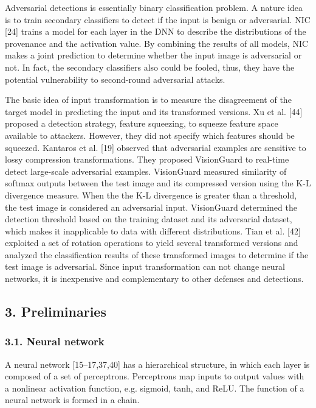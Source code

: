 \documentclass{article}
\begin{document}
Adversarial detections is essentially binary classification problem. A nature idea is to train secondary classifiers to detect if the input is benign or adversarial. NIC [24] trains a model for each layer in the DNN to describe the distributions of the provenance and the activation value. By combining the results of all models, NIC makes a joint prediction to determine whether the input image is adversarial or not. In fact, the secondary classifiers also could be fooled, thus, they have the potential vulnerability to second-round adversarial attacks.

The basic idea of input transformation is to measure the disagreement of the target model in predicting the input and its transformed versions. Xu et al. [44] proposed a detection strategy, feature squeezing, to squeeze feature space available to attackers. However, they did not specify which features should be squeezed. Kantaros et al. [19] observed that adversarial examples are sensitive to lossy compression transformations. They proposed VisionGuard to real-time detect large-scale adversarial examples. VisionGuard measured similarity of softmax outputs between the test image and its compressed version using the K-L divergence measure. When the the K-L divergence is greater than a threshold, the test image is considered an adversarial input. VisionGuard determined the detection threshold based on the training dataset and its adversarial dataset, which makes it inapplicable to data with different distributions. Tian et al. [42] exploited a set of rotation operations to yield several transformed versions and analyzed the classification results of these transformed images to determine if the test image is adversarial. Since input transformation can not change neural networks, it is inexpensive and complementary to other defenses and detections.

\subsection{3. Preliminaries}

\subsubsection{3.1. Neural network}

A neural network [15–17,37,40] has a hierarchical structure, in which each layer is composed of a set of perceptrons. Perceptrons map inputs to output values with a nonlinear activation function, e.g. sigmoid, tanh, and ReLU. The function of a neural network is formed in a chain.
\end{document}
